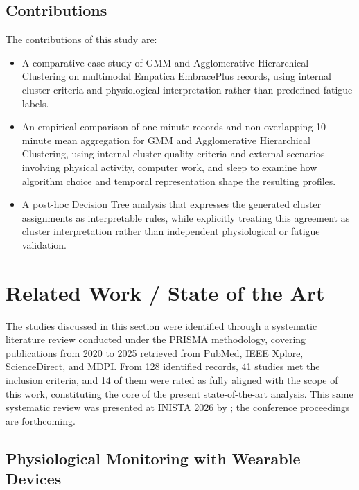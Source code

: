 \documentclass[a4paper,fleqn]{cas-sc}
\newcommand{\newtextblue}[1]{{\color{blue}#1}}
\newcommand{\newtextgreen}[1]{{\color{green!60!black}#1}}
\begin{document}
\subsection{Contributions}
\newtextblue{The contributions of this study are:}
\begin{itemize}
\item \newtextblue{A comparative case study of GMM and Agglomerative Hierarchical Clustering on multimodal Empatica EmbracePlus records, using internal cluster criteria and physiological interpretation rather than predefined fatigue labels.}
\item \newtextblue{An empirical comparison of one-minute records and non-overlapping 10-minute mean aggregation for GMM and Agglomerative Hierarchical Clustering, using internal cluster-quality criteria and external scenarios involving physical activity, computer work, and sleep to examine how algorithm choice and temporal representation shape the resulting profiles.}
\item \newtextblue{A post-hoc Decision Tree analysis that expresses the generated cluster assignments as interpretable rules, while explicitly treating this agreement as cluster interpretation rather than independent physiological or fatigue validation.}
\end{itemize}

\section{Related Work / State of the Art}\label{sec:related}

\newtextgreen{The studies discussed in this section were identified through a systematic literature review conducted under the PRISMA methodology, covering publications from 2020 to 2025 retrieved from PubMed, IEEE Xplore, ScienceDirect, and MDPI. From 128 identified records, 41 studies met the inclusion criteria, and 14 of them were rated as fully aligned with the scope of this work, constituting the core of the present state-of-the-art analysis. This same systematic review was presented at INISTA 2026 by \citet{freitas2026physiological}; the conference proceedings are forthcoming.}

\subsection{Physiological Monitoring with Wearable Devices}
\end{document}

